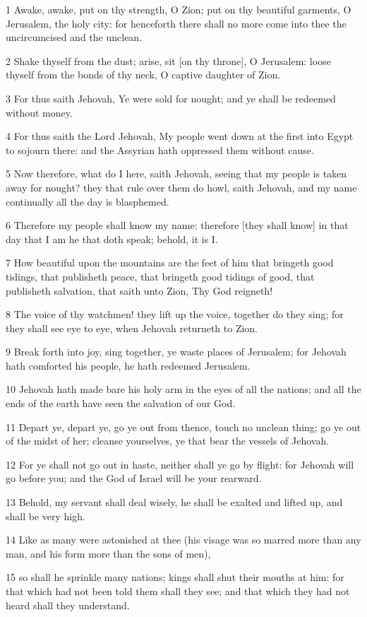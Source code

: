 \par 1 Awake, awake, put on thy strength, O Zion; put on thy beautiful garments, O Jerusalem, the holy city: for henceforth there shall no more come into thee the uncircumcised and the unclean.
\par 2 Shake thyself from the dust; arise, sit [on thy throne], O Jerusalem: loose thyself from the bonds of thy neck, O captive daughter of Zion.
\par 3 For thus saith Jehovah, Ye were sold for nought; and ye shall be redeemed without money.
\par 4 For thus saith the Lord Jehovah, My people went down at the first into Egypt to sojourn there: and the Assyrian hath oppressed them without cause.
\par 5 Now therefore, what do I here, saith Jehovah, seeing that my people is taken away for nought? they that rule over them do howl, saith Jehovah, and my name continually all the day is blasphemed.
\par 6 Therefore my people shall know my name: therefore [they shall know] in that day that I am he that doth speak; behold, it is I.
\par 7 How beautiful upon the mountains are the feet of him that bringeth good tidings, that publisheth peace, that bringeth good tidings of good, that publisheth salvation, that saith unto Zion, Thy God reigneth!
\par 8 The voice of thy watchmen! they lift up the voice, together do they sing; for they shall see eye to eye, when Jehovah returneth to Zion.
\par 9 Break forth into joy, sing together, ye waste places of Jerusalem; for Jehovah hath comforted his people, he hath redeemed Jerusalem.
\par 10 Jehovah hath made bare his holy arm in the eyes of all the nations; and all the ends of the earth have seen the salvation of our God.
\par 11 Depart ye, depart ye, go ye out from thence, touch no unclean thing; go ye out of the midst of her; cleanse yourselves, ye that bear the vessels of Jehovah.
\par 12 For ye shall not go out in haste, neither shall ye go by flight: for Jehovah will go before you; and the God of Israel will be your rearward.
\par 13 Behold, my servant shall deal wisely, he shall be exalted and lifted up, and shall be very high.
\par 14 Like as many were astonished at thee (his visage was so marred more than any man, and his form more than the sons of men),
\par 15 so shall he sprinkle many nations; kings shall shut their mouths at him: for that which had not been told them shall they see; and that which they had not heard shall they understand.

